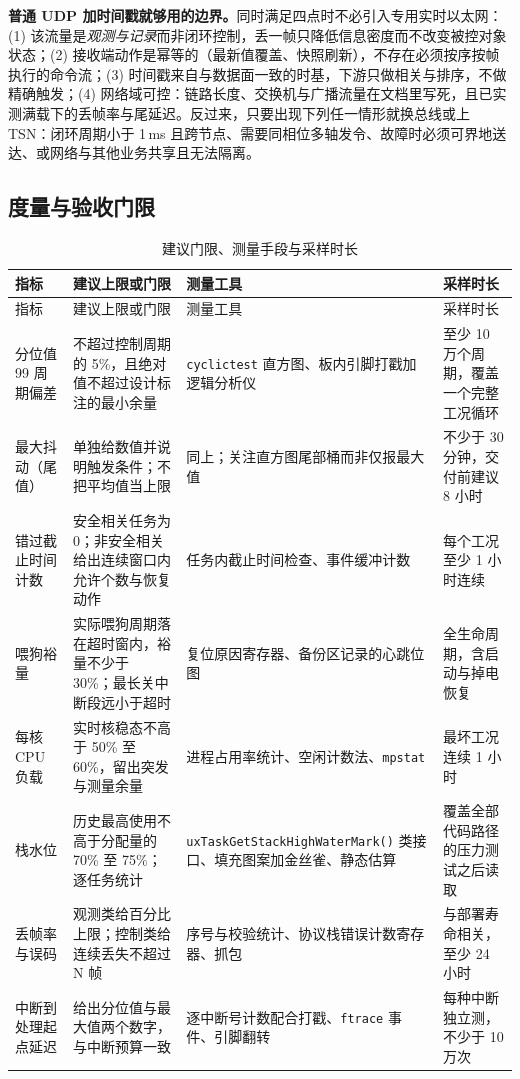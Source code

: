 \documentclass[12pt,a4paper,fontset=fandol]{ctexbook}
\newcommand{\Fn}[1]{\texttt{#1()}}
\newcommand{\Tp}[1]{\texttt{#1}}
\newcommand{\Bk}{\discretionary{}{}{}}
\begin{document}
\textbf{普通 UDP 加时间戳就够用的边界。}同时满足四点时不必引入专用实时以太网：(1) 该流量是\emph{观测与记录}而非闭环控制，丢一帧只降低信息密度而不改变被控对象状态；(2) 接收端动作是幂等的（最新值覆盖、快照刷新），不存在必须按序按帧执行的命令流；(3) 时间戳来自与数据面一致的时基，下游只做相关与排序，不做精确触发；(4) 网络域可控：链路长度、交换机与广播流量在文档里写死，且已实测满载下的丢帧率与尾延迟。反过来，只要出现下列任一情形就换总线或上 TSN：闭环周期小于 1\,ms 且跨节点、需要同相位多轴发令、故障时必须可界地送达、或网络与其他业务共享且无法隔离。

\subsection{度量与验收门限}

\begin{longtable}{>{\raggedright\arraybackslash\footnotesize}p{}>{\raggedright\arraybackslash\footnotesize}p{}>{\raggedright\arraybackslash\footnotesize}p{}>{\raggedright\arraybackslash\footnotesize}p{}}
\caption{建议门限、测量手段与采样时长}\label{tab:apC-gate} \\
\toprule
指标 & 建议上限或门限 & 测量工具 & 采样时长 \\
\midrule
\endfirsthead
\toprule
指标 & 建议上限或门限 & 测量工具 & 采样时长 \\
\midrule
\endhead
\bottomrule
\endfoot
\endlastfoot
分位值 99 周期偏差 & 不超过控制周期的 5\%，且绝对值不超过设计标注的最小余量 & \Tp{cyclictest} 直方图、板内引脚打戳加逻辑分析仪 & 至少 10 万个周期，覆盖一个完整工况循环 \\
最大抖动（尾值） & 单独给数值并说明触发条件；不把平均值当上限 & 同上；关注直方图尾部桶而非仅报最大值 & 不少于 30 分钟，交付前建议 8 小时 \\
错过截止时间计数 & 安全相关任务为 0；非安全相关给出连续窗口内允许个数与恢复动作 & 任务内截止时间检查、事件缓冲计数 & 每个工况至少 1 小时连续 \\
喂狗裕量 & 实际喂狗周期落在超时窗内，裕量不少于 30\%；最长关中断段远小于超时 & 复位原因寄存器、备份区记录的心跳位图 & 全生命周期，含启动与掉电恢复 \\
每核 CPU 负载 & 实时核稳态不高于 50\% 至 60\%，留出突发与测量余量 & 进程占用率统计、空闲计数法、\Tp{mpstat} & 最坏工况连续 1 小时 \\
栈水位 & 历史最高使用不高于分配量的 70\% 至 75\%；逐任务统计 & \Fn{uxTask{\Bk}Get{\Bk}Stack{\Bk}HighWaterMark} 类接口、填充图案加金丝雀、静态估算 & 覆盖全部代码路径的压力测试之后读取 \\
丢帧率与误码 & 观测类给百分比上限；控制类给连续丢失不超过 N 帧 & 序号与校验统计、协议栈错误计数寄存器、抓包 & 与部署寿命相关，至少 24 小时 \\
中断到处理起点延迟 & 给出分位值与最大值两个数字，与中断预算一致 & 逐中断号计数配合打戳、\Tp{ftrace} 事件、引脚翻转 & 每种中断独立测，不少于 10 万次 \\
\end{longtable}
\end{document}
